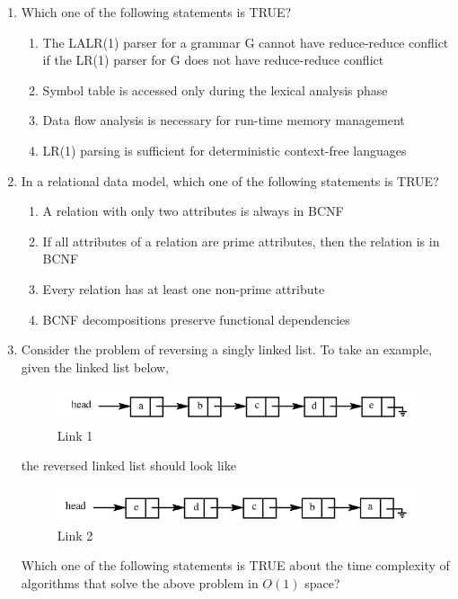 \begin{enumerate}
\hfill{}

\item Which one of the following statements is TRUE?  

\begin{enumerate}
\item The LALR(1) parser for a grammar G cannot have reduce-reduce conflict if the LR(1) parser for G does not have reduce-reduce conflict
\item Symbol table is accessed only during the lexical analysis phase
\item Data flow analysis is necessary for run-time memory management
\item LR(1) parsing is sufficient for deterministic context-free languages
\end{enumerate}

\hfill{}

\item In a relational data model, which one of the following statements is TRUE?  

\begin{enumerate}
\item A relation with only two attributes is always in BCNF
\item If all attributes of a relation are prime attributes, then the relation is in BCNF
\item Every relation has at least one non-prime attribute
\item BCNF decompositions preserve functional dependencies
\end{enumerate}

\hfill{}

\item Consider the problem of reversing a singly linked list. To take an example, given the linked list below,  
\begin{figure}[H]
\centering
\includegraphics[width=0.8\columnwidth]{figs/q15-1.png}
\caption{Link 1}
\label{fig:q15}
\end{figure}
the reversed linked list should look like  
\begin{figure}[H]
\centering
\includegraphics[width=0.8\columnwidth]{figs/q15-2.png}
\caption{Link 2}
\label{fig:q15}
\end{figure}
Which one of the following statements is TRUE about the time complexity of algorithms that solve the above problem in $O(1)$ space?  


\end{enumerate}
